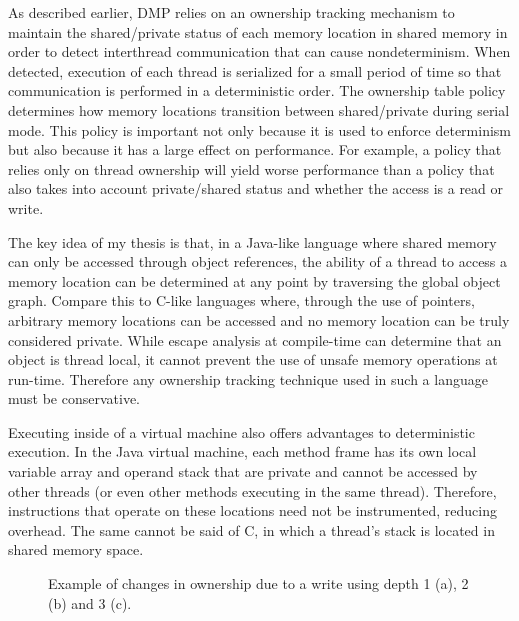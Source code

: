 As described earlier, DMP relies on an ownership tracking mechanism to
maintain the shared/private status of each memory location in shared
memory in order to detect interthread communication that can cause
nondeterminism.  When detected, execution of each thread is serialized
for a small period of time so that communication is performed in a
deterministic order.  The ownership table policy determines how memory
locations transition between shared/private during serial mode.  This
policy is important not only because it is used to enforce determinism
but also because it has a large effect on performance.  For example, a
policy that relies only on thread ownership will yield worse
performance than a policy that also takes into account private/shared
status and whether the access is a read or write.

The key idea of my thesis is that, in a Java-like language where
shared memory can only be accessed through object references, the
ability of a thread to access a memory location can be determined at
any point by traversing the global object graph.  Compare this to
C-like languages where, through the use of pointers, arbitrary memory
locations can be accessed and no memory location can be truly
considered private.  While escape analysis at compile-time can
determine that an object is thread local, it cannot prevent the use of
unsafe memory operations at run-time.  Therefore any ownership
tracking technique used in such a language must be conservative.

Executing inside of a virtual machine also offers advantages to
deterministic execution.  In the Java virtual machine, each method
frame has its own local variable array and operand stack that are
private and cannot be accessed by other threads (or even other methods
executing in the same thread).  Therefore, instructions that operate
on these locations need not be instrumented, reducing overhead.  The
same cannot be said of C, in which a thread's stack is located in
shared memory space.

\begin{figure}[!]
  \begin{center}
    {}
  \end{center}
  \caption{Example of changes in ownership due to a write using depth 1 (a), 2
    (b) and 3 (c).}
  \label{fig:depth}
\end{figure}

